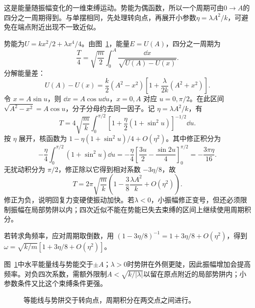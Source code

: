 \begin{solution}
这是能量随振幅变化的一维束缚运动。势能为偶函数，所以一个周期可由$0\to A$的四分之一周期得到。与单摆相同，先处理转向点，再展开小参数$\eta=\lambda A^2/k$，可避免在端点附近出现不一致近似。


势能为$U=kx^2/2+\lambda x^4/4$。由图~\ref{fig:c1-h8-s}，能量$E=U(A)$，四分之一周期为
\[\frac T4=\sqrt{\frac m2}\int_0^A\frac{\dd x}{\sqrt{U(A)-U(x)}}.
\]
分解能量差：
\[U(A)-U(x)=\frac k2(A^2-x^2)\left[1+\frac\lambda{2k}(A^2+x^2)\right].
\]
令 $x=A\sin u$，则 $\dd x=A\cos u\dd u$，$x=0,A$ 对应 $u=0,\pi/2$。在此区间 $\sqrt{A^2-x^2}=A\cos u$，分子分母约去同一因子。记 $\eta=\lambda A^2/k$，有
\[T=4\sqrt{\frac mk}\int_0^{\pi/2}
\left[1+\frac\eta2(1+\sin^2u)\right]^{-1/2}\dd u.
\]
按 $\eta$ 展开，核函数为 $1-\eta(1+\sin^2u)/4+O(\eta^2)$。其中修正积分为
\[
-\frac\eta4\int_0^{\pi/2}(1+\sin^2u)\dd u
=-\frac\eta4\left[\frac{3u}{2}-\frac{\sin2u}{4}\right]_0^{\pi/2}
=-\frac{3\pi\eta}{16}.
\]
无扰动积分为 $\pi/2$，修正除以它得到相对系数 $-3\eta/8$，故
\[\boxed{T=2\pi\sqrt{\frac mk}\left(1-\frac38\frac{\lambda A^2}{k}+O(\eta^2)\right)}.
\]
修正为负，说明回复力变硬使振动加快。若$\lambda<0$，小振幅修正变号，但还必须限制振幅在局部势阱以内；四次近似不能在势能已失去束缚的区间上继续使用周期积分。


若转求角频率，应对周期取倒数，用 $(1-3\eta/8)^{-1}=1+3\eta/8+O(\eta^2)$，得到 $\omega=\sqrt{k/m}[1+3\eta/8+O(\eta^2)]$。

图~\ref{fig:c1-h8-s}中水平能量线与势能交于$\pm A$；$\lambda>0$时势阱在外侧更陡，因此振幅增加会提高频率。对负四次系数，需额外限制$A<\sqrt{k/|\lambda|}$以留在原点附近的局部势阱内；小参数条件又比这个束缚条件更强。

\begin{figure}[H]\centering
{}
\caption{等能线与势阱交于转向点，周期积分在两交点之间进行。}\label{fig:c1-h8-s}
\end{figure}
\end{solution}

